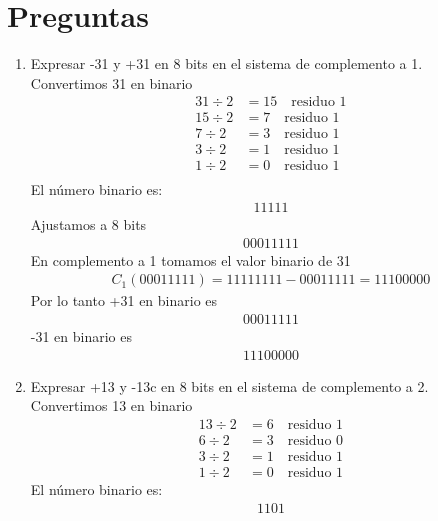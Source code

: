 \documentclass{article}
\begin{document}
\section*{Preguntas}
\begin{enumerate}
    \item Expresar -31 y +31 en 8 bits en el sistema de complemento a 1. \\
    Convertimos 31 en binario \\
    \begin{align*}
    31 \div 2 &= 15 \quad \text{residuo } 1 \\
    15 \div 2 &= 7 \quad \text{residuo } 1 \\
    7 \div 2 &= 3 \quad \text{residuo } 1 \\
    3 \div 2 &= 1 \quad \text{residuo } 1 \\
    1 \div 2 &= 0 \quad \text{residuo } 1 \\
    \end{align*}
    El número binario es:
    \begin{align*}
        11111
    \end{align*}
    Ajustamos a 8 bits
    \begin{align*}
        00011111
    \end{align*}
    En complemento a 1 tomamos el valor binario de 31
    \begin{align*}
        C_1(00011111) = 11111111 - 00011111 = 11100000
    \end{align*}
    Por lo tanto +31 en binario es
    \begin{align*}
        00011111
    \end{align*}
    -31 en binario es 
    \begin{align*}
        11100000
    \end{align*}
    \item Expresar +13 y -13c en 8 bits en el sistema de complemento a 2. \\
    Convertimos 13 en binario 
    \begin{align*}
    13 \div 2 &= 6 \quad \text{residuo } 1 \\
    6 \div 2 &= 3 \quad \text{residuo } 0 \\
    3 \div 2 &= 1 \quad \text{residuo } 1 \\
    1 \div 2 &= 0 \quad \text{residuo } 1 
    \end{align*}
    El número binario es:
    \begin{align*}
        1101
    \end{align*}

\end{enumerate}
\end{document}
